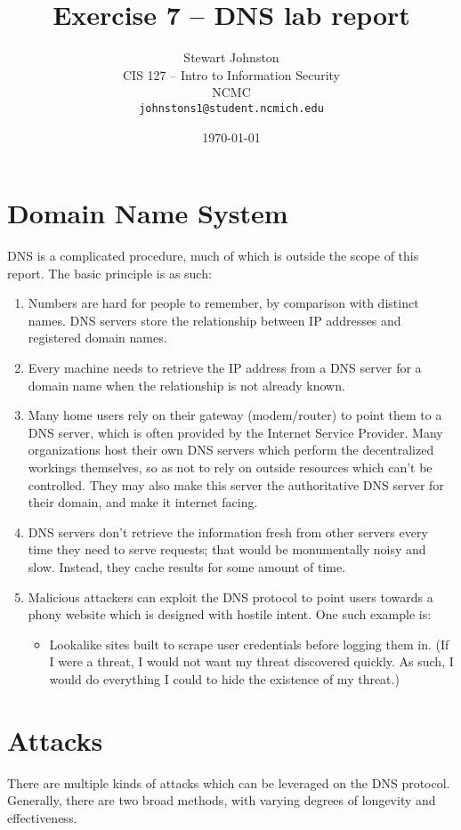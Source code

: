 \documentclass{article}
\title{Exercise 7 -- DNS lab report}
\author{Stewart Johnston\\
  {CIS 127 -- Intro to Information Security}\\
  {NCMC}\\
  {\texttt{johnstons1@student.ncmich.edu}}
}
\date{\today}
\begin{document}
\maketitle

\section{Domain Name System}
	DNS is a complicated procedure, much of which is outside the scope of
	this report. The basic principle is as such:

\begin{enumerate}
	\item Numbers are hard for people to remember, by comparison with
		distinct names. DNS servers store the relationship between IP
		addresses and registered domain names.
	\item Every machine needs to retrieve the IP address from a
		DNS server for a domain name when the relationship is not
		already known.
	\item Many home users rely on their gateway (modem/router) to point
		them to a DNS server, which is often provided by the Internet
		Service Provider. Many organizations host their own DNS servers
		which perform the decentralized workings themselves, so as not
		to rely on outside resources which can't be controlled. They
		may also make this server the authoritative DNS server for
		their domain, and make it internet facing.
	\item DNS servers don't retrieve the information fresh from other
		servers every time they need to serve requests; that would be
		monumentally noisy and slow. Instead, they cache results for
		some amount of time.
	\item Malicious attackers can exploit the DNS protocol to point users
		towards a phony website which is designed with hostile intent.
		One such example is:
		\begin{itemize}
			\item Lookalike sites built to scrape user credentials
				before logging them in. (If I were a threat, I
				would not want my threat discovered quickly. As
				such, I would do everything I could to hide the
				existence of my threat.)
		\end{itemize}
\end{enumerate}

\section{Attacks}
	There are multiple kinds of attacks which can be leveraged on the DNS
	protocol.  Generally, there are two broad methods, with varying degrees
	of longevity and effectiveness.
\end{document}
